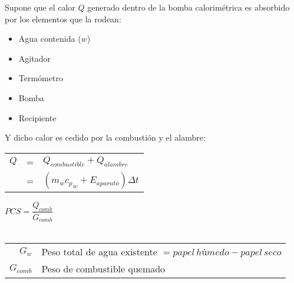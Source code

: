 \documentclass[11pt,a4paper]{article}
\begin{document}
	\begin{cajita}
		
		
		\vspace{-.6cm}
		
		\begin{multicols}{2}
			\begin{flushleft}
				Supone que el calor $Q$ generado dentro de la bomba calorimétrica es absorbido por los elementos que la rodean:
				\begin{itemize}
					\item Agua contenida ($w$)\\[.1cm]
					\item Agitador\\[.1cm]
					\item Termómetro\\[.1cm]
					\item Bomba\\[.1cm]
					\item Recipiente
				\end{itemize} 
			
				Y dicho calor es cedido por la combustión y el alambre:
			\end{flushleft} 
			\begin{tabular}{r c l}
				$Q$ & = & $Q_{combustible} + Q_{alambre}$\\[.2cm]
					& = & $\left(m_{w} {c_p}_{w} + E_{aparato}\right) \Delta t$\\[.2cm]
			\end{tabular}
			
			\columnbreak
			
			$PCS = \dfrac{Q_{comb}}{G_{comb}}$\\[.1cm]
			
			
			\\[.1cm]
			\vspace{.3cm}
		
			
			\begin{tabular}{r p{.7\linewidth}}
				$G_w$ & Peso total de agua existente $= papel\,húmedo - papel\, seco$\\
				$G_{comb}$ & Peso de combustible quemado\\
			\end{tabular}
		\end{multicols}
		
	\end{cajita}
	
\end{document}

